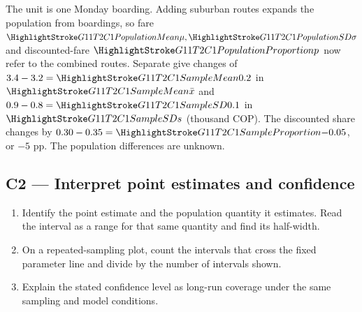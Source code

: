  The unit is one Monday boarding. Adding suburban routes expands the population from  boardings, so fare \(\PopulationMean{\mu},\PopulationSD{\sigma}\) and discounted-fare \(\PopulationShare{p}\) now refer to the combined routes. Separate  give changes of \(3.4-3.2=\SampleMean{0.2}\) in \(\SampleMean{\bar x}\) and \(0.9-0.8=\SampleSD{0.1}\) in \(\SampleSD{s}\) (thousand COP). The discounted share changes by \(0.30-0.35=\SampleShare{-0.05}\), or \(-5\) pp. The population differences are unknown.
\par\nobreak
{}

\clearpage
\subsection{C2 --- Interpret point estimates and confidence}\label{crit:c2}
\begin{enumerate}
  \item Identify the point estimate and the population quantity it estimates. Read the interval as a range for that same quantity and find its half-width.
  \item On a repeated-sampling plot, count the intervals that cross the fixed parameter line and divide by the number of intervals shown.
  \item Explain the stated confidence level as long-run coverage under the same sampling and model conditions.
\end{enumerate}

